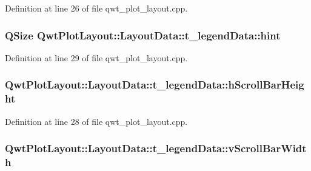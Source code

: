 Definition at line 26 of file qwt\-\_\-plot\-\_\-layout.\-cpp.

\hypertarget{struct_qwt_plot_layout_1_1_layout_data_1_1t__legend_data_a9d45ea68317dd739fbb0f909e412ea71}{
\subsubsection[{hint}]{\setlength{\rightskip}{0pt plus 5cm}Q\-Size Qwt\-Plot\-Layout\-::\-Layout\-Data\-::t\-\_\-legend\-Data\-::hint}}\label{struct_qwt_plot_layout_1_1_layout_data_1_1t__legend_data_a9d45ea68317dd739fbb0f909e412ea71}


Definition at line 29 of file qwt\-\_\-plot\-\_\-layout.\-cpp.

\hypertarget{struct_qwt_plot_layout_1_1_layout_data_1_1t__legend_data_a6736ae026a3f7c170b6ca8a021e73df6}{
\subsubsection[{h\-Scroll\-Bar\-Height}]{ Qwt\-Plot\-Layout\-::\-Layout\-Data\-::t\-\_\-legend\-Data\-::h\-Scroll\-Bar\-Height}}\label{struct_qwt_plot_layout_1_1_layout_data_1_1t__legend_data_a6736ae026a3f7c170b6ca8a021e73df6}


Definition at line 28 of file qwt\-\_\-plot\-\_\-layout.\-cpp.

\hypertarget{struct_qwt_plot_layout_1_1_layout_data_1_1t__legend_data_a871d7cf7ee8f2931c2edf0b63273bdcd}{
\subsubsection[{v\-Scroll\-Bar\-Width}]{ Qwt\-Plot\-Layout\-::\-Layout\-Data\-::t\-\_\-legend\-Data\-::v\-Scroll\-Bar\-Width}}\label{struct_qwt_plot_layout_1_1_layout_data_1_1t__legend_data_a871d7cf7ee8f2931c2edf0b63273bdcd}


